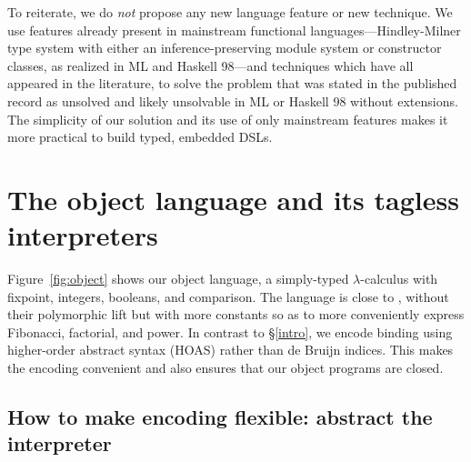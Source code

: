 To reiterate, we do \emph{not} propose any new language
feature or new technique. We use features already present in
mainstream functional languages---Hindley-Milner
type system with either an inference\hyp preserving module system or
constructor classes, as realized in ML and Haskell 98---and techniques
which have all appeared in the literature, to
solve the problem that was stated in the published record as
unsolved and likely unsolvable in ML or Haskell 98
without extensions. The simplicity of our solution and its
use of only mainstream features makes it more practical to build typed,
embedded DSLs.
\begin{comment}
We may claim some contribution about type-preserving CPS. Check
related work section in \cite{Guillemette-Monier-PLPV}, especially
check the work of Shao on type-preserving CPS in Flint. The PLPV paper
in related work shows other tasks, including closure conversion, which
we may tackle in our approach. We may be able to write a
type-preserving, assured compiler, whose properties and assured by HM.
\end{comment}


\section{The object language and its tagless interpreters}\label{language}

Figure~\ref{fig:object} shows our object language, a simply-typed
$\lambda$-calculus with fixpoint, integers, booleans, and comparison.
The language is close to , without their polymorphic
lift but with more constants so as to more conveniently express Fibonacci,
factorial, and power.
In contrast to \S\ref{intro}, we encode binding using higher-order
abstract syntax (HOAS) \cite{miller-manipulating,pfenning-higher-order}
rather than de Bruijn indices. This makes the encoding convenient and
also ensures that our object programs are closed.

\subsection{How to make encoding flexible: abstract the interpreter}
\label{encoding}

